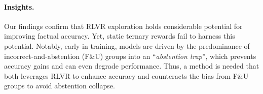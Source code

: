 \documentclass{article} %
\begin{document}






\paragraph{Insights.}  
Our findings confirm that RLVR exploration holds considerable potential for improving factual accuracy. 
Yet, static ternary rewards fail to harness this potential. 
Notably, early in training, models are driven by the predominance of incorrect-and-abstention (F\&U) groups into an ``\textit{abstention trap}'', which prevents accuracy gains and can even degrade performance. 
Thus, a method is needed that both leverages RLVR to enhance accuracy and counteracts the bias from F\&U groups to avoid abstention collapse.
\end{document}
